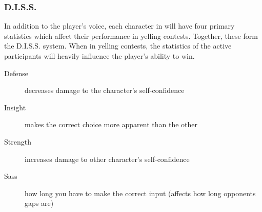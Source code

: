 \subsubsection{D.I.S.S.}
In addition to the player's voice, each character in \ourgame{} will have four primary statistics which affect their performance in yelling contests. Together, these form the D.I.S.S. system. When in yelling contests, the statistics of the active participants will heavily influence the player's ability to win.

\begin{description}
\item[Defense]{decreases damage to the character's self-confidence}
\item[Insight]{makes the correct choice more apparent than the other}
\item[Strength]{increases damage to other character's self-confidence}
\item[Sass]{how long you have to make the correct input (affects how long opponents gaps are)}
\end{description}